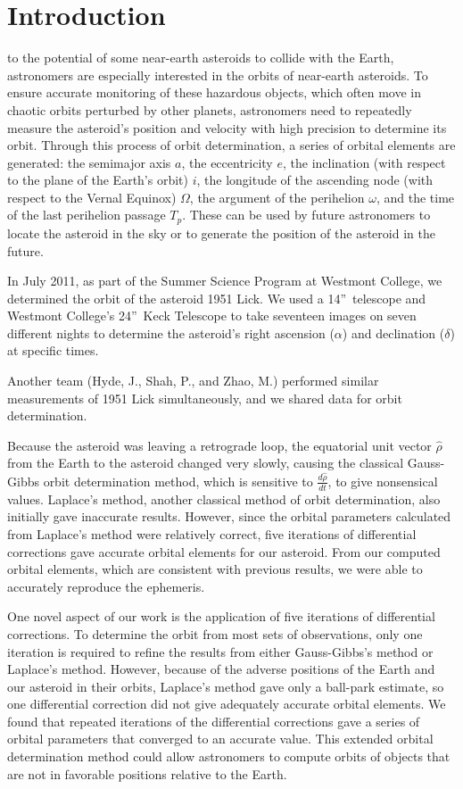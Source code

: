 \documentclass[12pt,journal,compsoc]{IEEEtran}
\begin{document}
\section{Introduction}
to the potential of some near-earth asteroids to collide with the Earth, astronomers are especially interested in the orbits of near-earth asteroids.
To ensure accurate monitoring of these hazardous objects, which often move in chaotic orbits perturbed by other planets, astronomers need to repeatedly measure the asteroid's position and velocity with high precision to determine its orbit.  Through this process of orbit determination, a series of orbital elements are generated: the semimajor axis $a$, the eccentricity $e$, the inclination (with respect to the plane of the Earth's orbit) $i$, the longitude of the ascending node (with respect to the Vernal Equinox) $\Omega$, the argument of the perihelion $\omega$, and the time of the last perihelion passage $T_p$.  These can be used by future astronomers to locate the asteroid in the sky or to generate the position of the asteroid in the future.

In July 2011, as part of the Summer Science Program at Westmont College, we determined the orbit of the asteroid 1951 Lick. We used a 14''~telescope and Westmont College's 24''~Keck Telescope to take seventeen images on seven different nights to determine the asteroid's right ascension ($\alpha$) and declination ($\delta$) at specific times.

Another team (Hyde, J., Shah, P., and Zhao, M.) performed similar measurements of 1951 Lick simultaneously, and we shared data for orbit determination.

Because the asteroid was leaving a retrograde loop, the equatorial unit vector $\hat{\rho}$ from the Earth to the asteroid changed very slowly, causing the classical Gauss-Gibbs orbit determination method, which is sensitive to $\frac{d\hat{\rho}}{dt}$, to give nonsensical values.
Laplace's method, another classical method of orbit determination, also initially gave inaccurate results.  However, since the orbital parameters calculated from Laplace's method were relatively correct, five iterations of differential corrections gave accurate orbital elements for our asteroid.
From our computed orbital elements, which are consistent with previous results, we were able to accurately reproduce the ephemeris.

One novel aspect of our work is the application of five iterations of differential corrections. To determine the orbit from most sets
of observations, only one iteration is required to refine the results from either Gauss-Gibbs's method or Laplace's method.
However, because of the adverse positions of the Earth and our asteroid in their orbits, Laplace's method
gave only a ball-park estimate, so one differential correction did not give adequately accurate orbital elements.
We found that repeated iterations of the differential corrections gave a series of orbital parameters that converged
to an accurate value. This extended orbital determination method could allow astronomers to
compute orbits of objects that are not in favorable positions relative to the Earth. 
\end{document}
